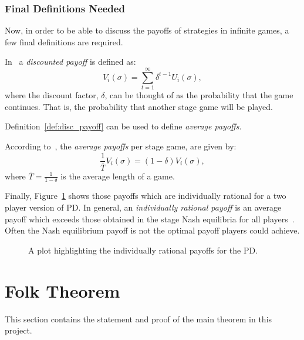 \subsubsection{Final Definitions Needed}\label{subsubsec:Final_Defs_Needed}
Now, in order to be able to discuss the payoffs of strategies in infinite games,
a few final definitions are required.

\begin{definition}\label{def:disc_payoff}
In~\cite{Knight2017} a \textit{discounted payoff} is defined as:
\begin{equation}
    V_{i}(\sigma) = \sum_{t=1}^{\infty}{\delta^{t-1}U_{i}(\sigma)},
\end{equation}
where the discount factor, \(\delta \), can be thought of as the probability
that the game continues. That is, the probability that another stage game will
be played. 
\end{definition}

Definition~\ref{def:disc_payoff} can be used to define \textit{average payoffs}.

\begin{definition}
    According to~\cite{Knight2017}, the \textit{average payoffs} per stage
    game, are given by:
   \begin{equation}
        \frac{1}{\overline{T}}V_{i}(\sigma) = (1-\delta)V_{i}(\sigma),    
    \end{equation}
    where \(\overline{T} = \frac{1}{1-\delta}\) is the average length of a game. 
\end{definition}

Finally, Figure~\ref{fig:Feasible_Payoff_Plot} shows those payoffs which are
individually rational for a two player version of PD\@. In
general, an \textit{individually rational payoff} is an average payoff which
exceeds those obtained in the stage Nash equilibria for all
players~\cite{Knight2017}. Often the Nash equilibrium payoff is not the
optimal payoff players could achieve.

\begin{figure}
    \centering
    
    \caption{A plot highlighting the individually rational payoffs for the PD.}\label{fig:Feasible_Payoff_Plot}
\end{figure}

\section{Folk Theorem}\label{sec:Folk_Thm}
This section contains the statement and proof of the main theorem in this project.

